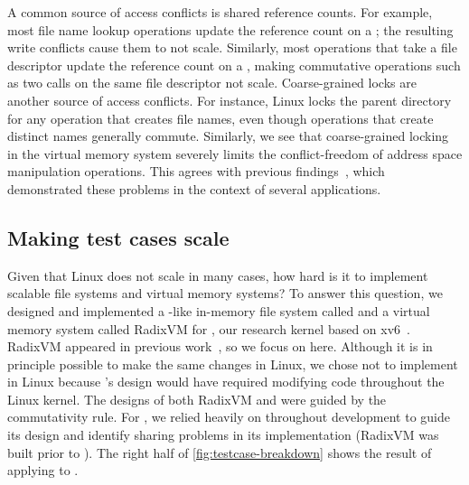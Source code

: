 A common source of access conflicts is shared reference counts.
%
For example, most file name lookup operations update the reference
count on a ; the resulting write conflicts cause
them to not scale.
%
Similarly, most operations that take a file descriptor update the
reference count on a , making
commutative operations such as two  calls on the
same file descriptor not scale.
Coarse-grained locks are another source of access conflicts.  For
instance, Linux locks the parent directory for any operation that
creates file names, even though operations that create distinct names
generally commute.
%
%
Similarly, we see that coarse-grained locking in the virtual memory
system severely limits the conflict-freedom of address space manipulation
operations. This agrees with previous
findings~\cite{boyd-wickizer:scaling,clements:radixvm,clements:bonsai},
which demonstrated these problems in the context of several applications.



\subsection{Making test cases scale}

Given that Linux does not scale in many cases, how hard is it
to implement scalable file systems and virtual memory systems?  To answer this
question, we designed and implemented a -like in-memory
file system called \fs and a virtual memory system called RadixVM for
\sys, our research kernel based on xv6~\cite{xv6}.  RadixVM appeared
in previous work~\cite{clements:radixvm}, so we focus on \fs here.
%
Although it is in principle possible to make the same changes in Linux,
we chose not to implement \fs in Linux because \fs's design
would have required modifying code throughout the Linux kernel.
%
The designs of both RadixVM and \fs were guided by the
commutativity rule.  For \fs, we relied heavily on \tool throughout
development to guide its design and identify sharing problems in its
implementation (RadixVM
was built prior to
\tool).
%
The right half of \cref{fig:testcase-breakdown} shows the
result of applying \tool
to \sys.

